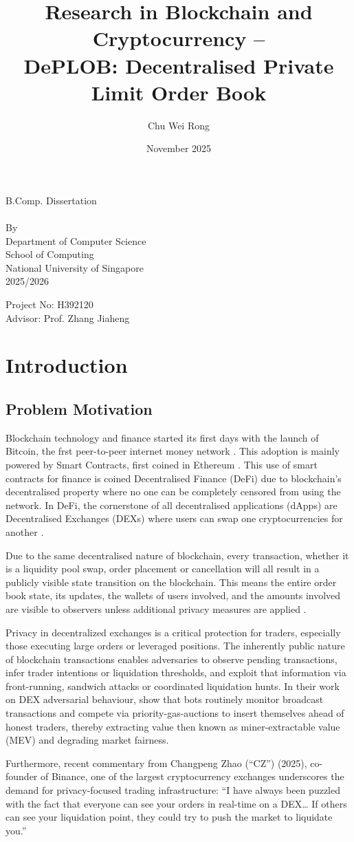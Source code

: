 \documentclass[12pt,a4paper]{article}
\title{Research in Blockchain and Cryptocurrency – \\
DePLOB: Decentralised Private Limit Order Book}
\author{Chu Wei Rong}
\date{November 2025}
\makeatletter
\let\vtitle\@title
\let\vauthor\@author
\newcommand{\customtitle}{%
    \begin{center}
        B.Comp. Dissertation\\[6em]
        \large \textbf{\vtitle}\\[6em]
        \normalsize By
        \vauthor\\[4em]
        Department of Computer Science\\[1em]
        School of Computing\\[1em]
        National University of Singapore\\[1em]
        2025/2026\\[4em]
    \end{center}
    Project No: H392120\\
    Advisor: Prof. Zhang Jiaheng
}
\makeatother
\begin{document}
\begin{titlepage}
\customtitle
\end{titlepage}
\tableofcontents
\clearpage
{}
\section{Introduction}
\subsection{Problem Motivation} 
Blockchain technology and finance started its first days with the launch of Bitcoin, the frst peer-to-peer internet money network \parencite{bitcoin}. This adoption is mainly powered by Smart Contracts, first coined in Ethereum \parencite{ethereum}. This use of smart contracts for finance is coined Decentralised Finance (DeFi) due to blockchain's decentralised property where no one can be completely censored from using the network. In DeFi, the cornerstone of all decentralised applications (dApps) are Decentralised Exchanges (DEXs) where users can swap one cryptocurrencies for another \parencite{lin2019deconstructing}.

Due to the same decentralised nature of blockchain, every transaction, whether it is a liquidity pool swap, order placement or cancellation will all result in a publicly visible state transition on the blockchain. This means the entire order book state, its updates, the wallets of users involved, and the amounts involved are visible to observers unless additional privacy measures are applied \parencite{schar2021decentralized}.

Privacy in decentralized exchanges is a critical protection for traders, especially those executing large orders or leveraged positions. The inherently public nature of blockchain transactions enables adversaries to observe pending transactions, infer trader intentions or liquidation thresholds, and exploit that information via front-running, sandwich attacks or coordinated liquidation hunts. In their work on DEX adversarial behaviour, \textcite{daian2019flash} show that bots routinely monitor broadcast transactions and compete via priority-gas-auctions to insert themselves ahead of honest traders, thereby extracting value then known as miner-extractable value (MEV) and degrading market fairness. 

Furthermore, recent commentary from Changpeng Zhao (“CZ”) (2025), co-founder of Binance, one of the largest cryptocurrency exchanges underscores the demand for privacy-focused trading infrastructure: “I have always been puzzled with the fact that everyone can see your orders in real-time on a DEX… If others can see your liquidation point, they could try to push the market to liquidate you.”
\end{document}
